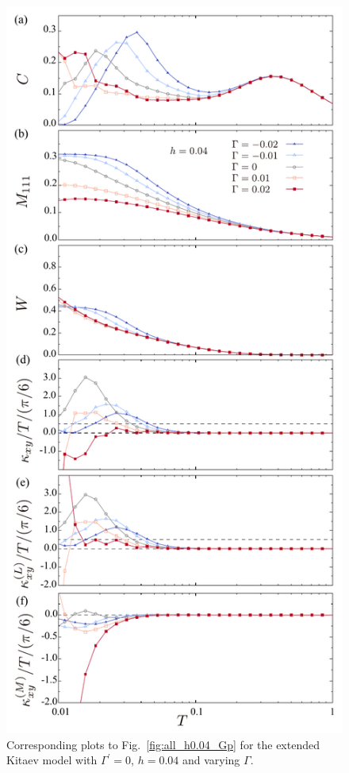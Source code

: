 \documentclass[twocolumn,superscriptaddress,showpacs, longbibliography, aps, prb]{revtex4-2}
\begin{document}
\begin{figure}
  \begin{center}
    \includegraphics[width=0.9\linewidth]{Figs/plot_all_h0.04_G.pdf}
  \end{center}
  \caption{
 Corresponding plots to Fig.~\ref{fig:all_h0.04_Gp} for the extended Kitaev model with $\Gamma^{\prime}=0$, $h=0.04$ and varying $\Gamma$. 
}
\end{figure}
\end{document}
